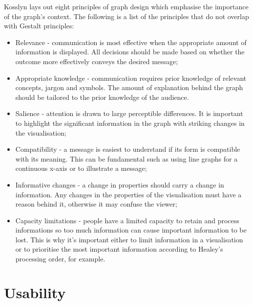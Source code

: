 			Kosslyn lays out eight principles of graph design which emphasise the importance of the graph's context\cite{graph_mind_kosslyn}. The following is a list of the principles that do not overlap with Gestalt principles:
			\begin{itemize}
				\item Relevance - communication is most effective when the appropriate amount of information is displayed. All decisions should be made based on whether the outcome more effectively conveys the desired message;
				\item Appropriate knowledge - communication requires prior knowledge of relevant concepts, jargon and symbols. The amount of explanation behind the graph should be tailored to the prior knowledge of the audience.
				\item Salience - attention is drawn to large perceptible differences. It is important to highlight the significant information in the graph with striking changes in the visualisation;
				\item Compatibility - a message is easiest to understand if its form is compatible with its meaning. This can be fundamental such as using line graphs for a continuous x-axis or to illustrate a message;
				\item Informative changes - a change in properties should carry a change in information. Any changes in the properties of the visualisation must have a reason behind it, otherwise it may confuse the viewer;
				\item Capacity limitations - people have a limited capacity to retain and process informations so too much information can cause important information to be lost. This is why it's important either to limit information in a visualisation or to prioritise the most important information according to Healey's processing order, for example.
			\end{itemize}
	\section{Usability}
